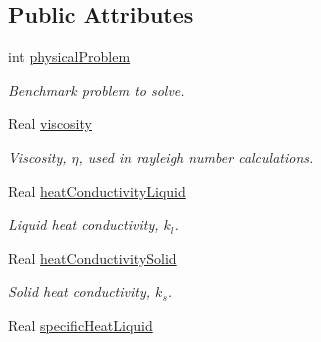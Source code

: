 \subsection*{Public Attributes}
\begin{DoxyCompactItemize}
\item 
\hypertarget{class_mushy_layer_params_ab3689b3bc343632d15684e88c48f2278}{int \hyperlink{class_mushy_layer_params_ab3689b3bc343632d15684e88c48f2278}{physical\-Problem}}\label{class_mushy_layer_params_ab3689b3bc343632d15684e88c48f2278}

\begin{DoxyCompactList}\small\item\em Benchmark problem to solve. \end{DoxyCompactList}\item 
\hypertarget{class_mushy_layer_params_a0458bb90fd4db3977b2af0a0aa369386}{Real \hyperlink{class_mushy_layer_params_a0458bb90fd4db3977b2af0a0aa369386}{viscosity}}\label{class_mushy_layer_params_a0458bb90fd4db3977b2af0a0aa369386}

\begin{DoxyCompactList}\small\item\em Viscosity, $ \eta $, used in rayleigh number calculations. \end{DoxyCompactList}\item 
\hypertarget{class_mushy_layer_params_ac5dcaee57b4ea4ea4fc1c26d578f2e48}{Real \hyperlink{class_mushy_layer_params_ac5dcaee57b4ea4ea4fc1c26d578f2e48}{heat\-Conductivity\-Liquid}}\label{class_mushy_layer_params_ac5dcaee57b4ea4ea4fc1c26d578f2e48}

\begin{DoxyCompactList}\small\item\em Liquid heat conductivity, $ k_l $. \end{DoxyCompactList}\item 
\hypertarget{class_mushy_layer_params_a57cd61cc35cfd06330a3cb6e67c1bddc}{Real \hyperlink{class_mushy_layer_params_a57cd61cc35cfd06330a3cb6e67c1bddc}{heat\-Conductivity\-Solid}}\label{class_mushy_layer_params_a57cd61cc35cfd06330a3cb6e67c1bddc}

\begin{DoxyCompactList}\small\item\em Solid heat conductivity, $ k_s $. \end{DoxyCompactList}\item 
\hypertarget{class_mushy_layer_params_ab80de1952111d2c7bd8eeb30c4388441}{Real \hyperlink{class_mushy_layer_params_ab80de1952111d2c7bd8eeb30c4388441}{specific\-Heat\-Liquid}}\label{class_mushy_layer_params_ab80de1952111d2c7bd8eeb30c4388441}


\end{DoxyCompactItemize}
